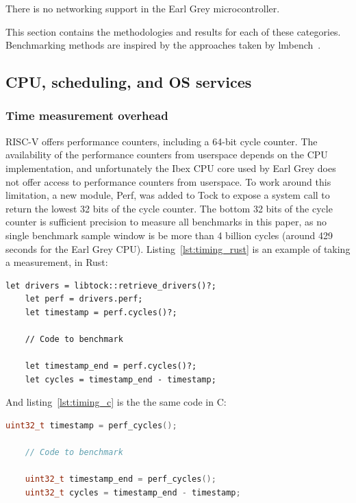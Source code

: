 \documentclass{article}
\begin{document}
There is no networking support in the Earl Grey microcontroller.

This section contains the methodologies and results for each of these categories. Benchmarking methods are inspired by the approaches taken by lmbench~\cite{lmbench}.

\subsection{CPU, scheduling, and OS services}

\subsubsection{Time measurement overhead} \label{subsubsec:time-measurement}

RISC-V offers performance counters, including a 64-bit cycle counter. The availability of the performance counters from userspace depends on the CPU implementation, and unfortunately the Ibex CPU core used by Earl Grey does not offer access to performance counters from userspace. To work around this limitation, a new module, Perf, was added to Tock to expose a system call to return the lowest 32 bits of the cycle counter. The bottom 32 bits of the cycle counter is sufficient precision to measure all benchmarks in this paper, as no single benchmark sample window is be more than 4 billion cycles (around 429 seconds for the Earl Grey CPU). Listing~\ref{lst:timing_rust} is an example of taking a measurement, in Rust:

\begin{lstlisting}[caption={Timing in Rust},label={lst:timing_rust}]
    let drivers = libtock::retrieve_drivers()?;
    let perf = drivers.perf;
    let timestamp = perf.cycles()?;
    
    // Code to benchmark
    
    let timestamp_end = perf.cycles()?;
    let cycles = timestamp_end - timestamp;
\end{lstlisting}

And listing~\ref{lst:timing_c} is the the same code in C:

\begin{lstlisting}[language=c,caption={Timing in C},label={lst:timing_c}]
    uint32_t timestamp = perf_cycles();
    
    // Code to benchmark
    
    uint32_t timestamp_end = perf_cycles();
    uint32_t cycles = timestamp_end - timestamp;
\end{lstlisting}
\end{document}

